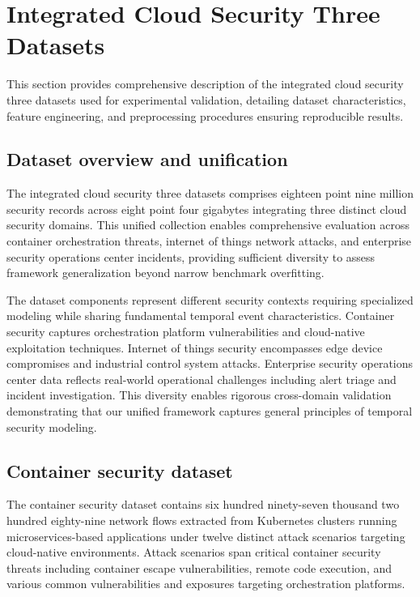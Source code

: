 \documentclass[10pt,journal,compsoc]{IEEEtran}
\begin{document}
\section{Integrated Cloud Security Three Datasets}
\label{sec:datasets}

This section provides comprehensive description of the integrated cloud security three datasets used for experimental validation, detailing dataset characteristics, feature engineering, and preprocessing procedures ensuring reproducible results.

\subsection{Dataset overview and unification}

The integrated cloud security three datasets comprises eighteen point nine million security records across eight point four gigabytes integrating three distinct cloud security domains. This unified collection enables comprehensive evaluation across container orchestration threats, internet of things network attacks, and enterprise security operations center incidents, providing sufficient diversity to assess framework generalization beyond narrow benchmark overfitting.

The dataset components represent different security contexts requiring specialized modeling while sharing fundamental temporal event characteristics. Container security captures orchestration platform vulnerabilities and cloud-native exploitation techniques. Internet of things security encompasses edge device compromises and industrial control system attacks. Enterprise security operations center data reflects real-world operational challenges including alert triage and incident investigation. This diversity enables rigorous cross-domain validation demonstrating that our unified framework captures general principles of temporal security modeling.

\subsection{Container security dataset}

The container security dataset contains six hundred ninety-seven thousand two hundred eighty-nine network flows extracted from Kubernetes clusters running microservices-based applications under twelve distinct attack scenarios targeting cloud-native environments. Attack scenarios span critical container security threats including container escape vulnerabilities, remote code execution, and various common vulnerabilities and exposures targeting orchestration platforms.
\end{document}
